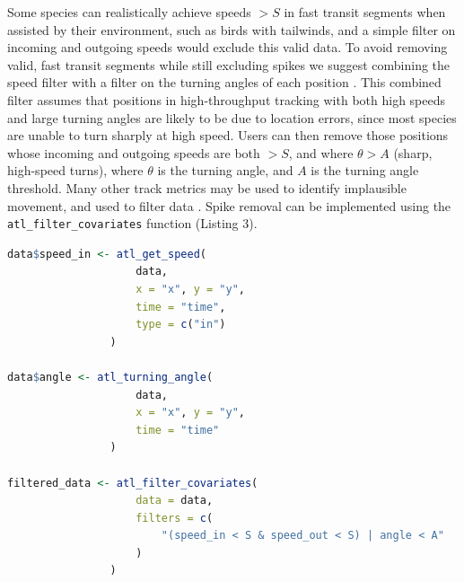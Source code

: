 \documentclass[10pt,paper=a4,headings=standardclasses
]{scrartcl}
\begin{document}
Some species can realistically achieve speeds $> S$ in fast transit segments when assisted by their environment, such as birds with tailwinds, and a simple filter on incoming and outgoing speeds would exclude this valid data.
To avoid removing valid, fast transit segments while still excluding spikes we suggest combining the speed filter with a filter on the turning angles of each position \citep[see][]{calenge2009}.
This combined filter assumes that positions in high-throughput tracking with both high speeds and large turning angles are likely to be due to location errors, since most species are unable to turn sharply at high speed.
Users can then remove those positions whose incoming and outgoing speeds are both $> S$, and where $\theta > A$ (sharp, high-speed turns), where $\theta$ is the turning angle, and $A$ is the turning angle threshold.
Many other track metrics may be used to identify implausible movement, and used to filter data \citep{seidel2018}.
Spike removal can be implemented using the \texttt{atl\_filter\_covariates} function (Listing 3).

\begin{lstlisting}[float, language=R, style=customR, caption = {
    Filtering a movement track on incoming and outgoing speeds, and on turning angle to remove unrealistic movement.
    The functions \texttt{atl\_get\_speed} and \texttt{atl\_turning\_angle} are used to get the speeds and turning angles before filtering, and assigned to a column in the data (assignment of \texttt{speed\_out} is not shown).
    The filter step only retains positions with speeds below the speed threshold $S$ \textit{or} angles above the turning angle threshold $\theta$, i.e., positions where the animal is slow but makes sharp turns, and data where the animal moves quickly in a relatively straight line.}]
data$speed_in <- atl_get_speed(
                    data,
                    x = "x", y = "y",
                    time = "time", 
                    type = c("in")
                )

data$angle <- atl_turning_angle(
                    data,
                    x = "x", y = "y", 
                    time = "time"
                )

filtered_data <- atl_filter_covariates(
                    data = data,
                    filters = c(
                        "(speed_in < S & speed_out < S) | angle < A"
                    )
                )
\end{lstlisting}
\end{document}
